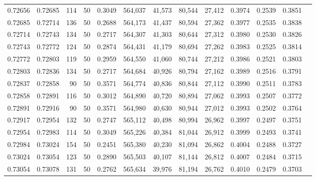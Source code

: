 \begin{tabular}{rrrrrrrrrrrrr}
0.72656 & 0.72685 &   114 &  50 &                                     0.3049 & 564,037 &  41,573 &  80,544 &  27,412 & 0.3974 & 0.2539 & 0.3851 \\
0.72685 & 0.72714 &   136 &  50 &                                     0.2688 & 564,173 &  41,437 &  80,594 &  27,362 & 0.3977 & 0.2535 & 0.3838 \\
0.72714 & 0.72743 &   134 &  50 &                                     0.2717 & 564,307 &  41,303 &  80,644 &  27,312 & 0.3980 & 0.2530 & 0.3826 \\
0.72743 & 0.72772 &   124 &  50 &                                     0.2874 & 564,431 &  41,179 &  80,694 &  27,262 & 0.3983 & 0.2525 & 0.3814 \\
0.72772 & 0.72803 &   119 &  50 &                                     0.2959 & 564,550 &  41,060 &  80,744 &  27,212 & 0.3986 & 0.2521 & 0.3803 \\
0.72803 & 0.72836 &   134 &  50 &                                     0.2717 & 564,684 &  40,926 &  80,794 &  27,162 & 0.3989 & 0.2516 & 0.3791 \\
0.72837 & 0.72858 &    90 &  50 &                                     0.3571 & 564,774 &  40,836 &  80,844 &  27,112 & 0.3990 & 0.2511 & 0.3783 \\
0.72858 & 0.72891 &   116 &  50 &                                     0.3012 & 564,890 &  40,720 &  80,894 &  27,062 & 0.3993 & 0.2507 & 0.3772 \\
0.72891 & 0.72916 &    90 &  50 &                                     0.3571 & 564,980 &  40,630 &  80,944 &  27,012 & 0.3993 & 0.2502 & 0.3764 \\
0.72917 & 0.72954 &   132 &  50 &                                     0.2747 & 565,112 &  40,498 &  80,994 &  26,962 & 0.3997 & 0.2497 & 0.3751 \\
0.72954 & 0.72983 &   114 &  50 &                                     0.3049 & 565,226 &  40,384 &  81,044 &  26,912 & 0.3999 & 0.2493 & 0.3741 \\
0.72984 & 0.73024 &   154 &  50 &                                     0.2451 & 565,380 &  40,230 &  81,094 &  26,862 & 0.4004 & 0.2488 & 0.3727 \\
0.73024 & 0.73054 &   123 &  50 &                                     0.2890 & 565,503 &  40,107 &  81,144 &  26,812 & 0.4007 & 0.2484 & 0.3715 \\
0.73054 & 0.73078 &   131 &  50 &                                     0.2762 & 565,634 &  39,976 &  81,194 &  26,762 & 0.4010 & 0.2479 & 0.3703 \\

\end{tabular}
